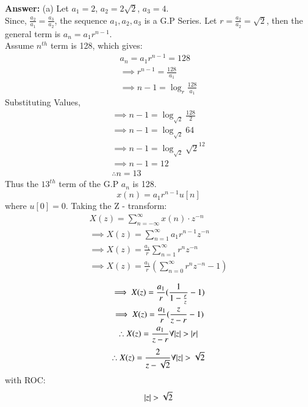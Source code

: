 \documentclass[journal,12pt,twocolumn]{IEEEtran}
\theoremstyle{remark}
\begin{document}
\textbf{Answer:} (a) Let $a_1 = 2$, $a_2 = 2\sqrt{2}$, $a_3 = 4$.\\
Since, $\frac{a_2}{a_1} = \frac{a_3}{a_2}$, the sequence $a_1, a_2, a_3$ is a G.P Series.
Let $r = \frac{a_2}{a_2} = \sqrt{2}$, then the general term is $a_n = a_1 r^{n-1}$.\\
Assume $n^{th}$ term is 128, which gives: 
\begin{gather*}
    a_n = a_1 r^{n-1} = 128\\
    \implies r^{n-1} = \frac{128}{a_1}\\
    \implies n - 1 = \log_{r}{\frac{128}{a_1}}
\end{gather*}
Substituting Values,
\begin{gather*}
    \implies n - 1 = \log_{\sqrt{2}}{\frac{128}{2}}\\
    \implies n - 1 = \log_{\sqrt{2}}{64}\\
    \implies n - 1 = \log_{\sqrt{2}}{\sqrt{2}^{12}}\\
    \implies n - 1 = 12\\
    \therefore n = 13
\end{gather*}
Thus the $13^{th}$ term of the G.P $a_n$ is 128.\\ 
\[ x(n) = a_1r^{n - 1}u[n] \] where $u[0] = 0$.
Taking the Z - transform:
\begin{gather*}
    X(z) = \sum_{n = -\infty}^{\infty}{x(n) \cdot z^{-n}}\\
    \implies X(z) = \sum_{n = 1}^{\infty}{a_1r^{n - 1}z^{-n}}\\
    \implies X(z) = \frac{a_1}{r}\sum_{n = 1}^{\infty}{r^n z^{-n}}\\
    \implies X(z) = \frac{a_1}{r}(\sum_{n = 0}^{\infty}{r^n z^{-n}} - 1)\\
\end{gather*}
\begin{gather*}
    \implies X(z) = \frac{a_1}{r}(\frac{1}{1 - \frac{r}{z}} - 1)\\
    \implies X(z) = \frac{a_1}{r}(\frac{z}{z - r} - 1)\\
    \therefore X(z) = \frac{a_1}{z - r}\forall { \left\vert z\right\vert > \left\vert r\right\vert}\\
\end{gather*}
\[\therefore X(z) = \frac{2}{z - \sqrt{2}}\forall { \left\vert z\right\vert > \sqrt{2}}\]
with ROC: \[{ \left\vert z\right\vert > \sqrt{2}}\]
\end{document}
